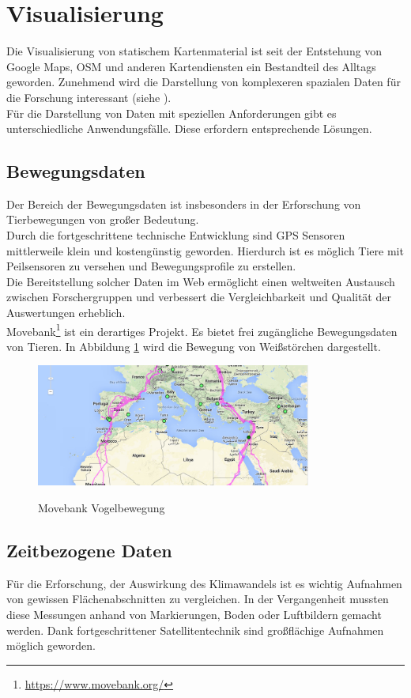 \documentclass[10pt,conference,compsocconf]{IEEEtran}
\begin{document}
\section{Visualisierung}
Die Visualisierung von statischem Kartenmaterial ist seit der Entstehung von Google Maps, OSM und anderen Kartendiensten ein Bestandteil des Alltags geworden. Zunehmend wird die Darstellung von komplexeren spazialen Daten für die Forschung interessant (siehe \cite{gps_collars} \cite{wms_flow_mapping}).\\
Für die Darstellung von Daten mit speziellen Anforderungen gibt es unterschiedliche Anwendungsfälle. Diese erfordern entsprechende Lösungen.

\subsection{Bewegungsdaten}
Der Bereich der Bewegungsdaten ist insbesonders in der Erforschung von Tierbewegungen von großer Bedeutung\cite{gps_collars}.\\
Durch die fortgeschrittene technische Entwicklung sind GPS Sensoren mittlerweile klein und kostengünstig geworden. Hierdurch ist es möglich Tiere mit Peilsensoren zu versehen und Bewegungsprofile zu erstellen.\\
Die Bereitstellung solcher Daten im Web ermöglicht einen weltweiten Austausch zwischen Forschergruppen und verbessert die Vergleichbarkeit und Qualität der Auswertungen erheblich.\\
Movebank\footnote{\url{https://www.movebank.org/}} ist ein derartiges Projekt. Es bietet frei zugängliche Bewegungsdaten von Tieren. In Abbildung \ref{img:movebank} wird die Bewegung von Weißstörchen dargestellt.

\begin{figure}[H]
  \centering
  	\includegraphics[height=114pt]{img/movebank}\\
  \caption[]{Movebank Vogelbewegung}
  \label{img:movebank}
\end{figure}


\subsection{Zeitbezogene Daten}
\label{sub:zeitbezogene_daten}
Für die Erforschung, der Auswirkung des Klimawandels ist es wichtig Aufnahmen von gewissen Flächenabschnitten zu vergleichen. In der Vergangenheit mussten diese Messungen anhand von Markierungen, Boden oder Luftbildern gemacht werden. Dank fortgeschrittener Satellitentechnik sind großflächige Aufnahmen möglich geworden.\par
\end{document}
